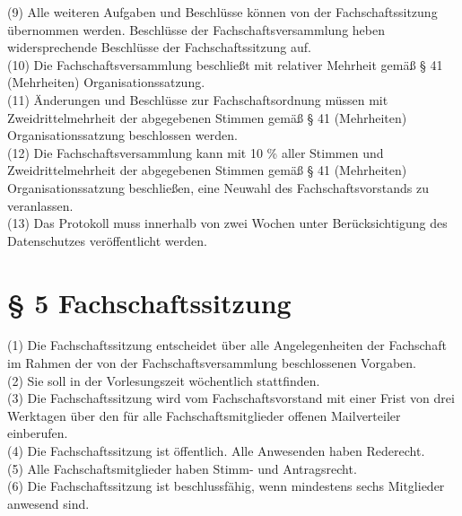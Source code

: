 \documentclass[a4paper, parskip=half, numbers=noenddot]{scrartcl}
\begin{document}
(9) Alle weiteren Aufgaben und Beschlüsse können von der Fachschaftssitzung übernommen werden. Beschlüsse der Fachschaftsversammlung heben widersprechende Beschlüsse der Fachschaftssitzung auf.\\

(10) Die Fachschaftsversammlung beschließt mit relativer Mehrheit gemäß § 41 (Mehrheiten) Organisationssatzung.\\

(11) Änderungen und Beschlüsse zur Fachschaftsordnung müssen mit Zweidrittelmehrheit der abgegebenen Stimmen gemäß § 41 (Mehrheiten) Organisationssatzung beschlossen werden.\\

(12) Die Fachschaftsversammlung kann mit 10 \% aller Stimmen und Zweidrittelmehrheit der abgegebenen Stimmen gemäß § 41 (Mehrheiten) Organisationssatzung beschließen, eine Neuwahl des Fachschaftsvorstands zu veranlassen.\\

(13) Das Protokoll muss innerhalb von zwei Wochen unter Berücksichtigung des Datenschutzes veröffentlicht werden.\\


%
%

\section*{§ 5 Fachschaftssitzung}

(1) Die Fachschaftssitzung entscheidet über alle Angelegenheiten der Fachschaft im Rahmen der von der Fachschaftsversammlung beschlossenen Vorgaben.\\

(2) Sie soll in der Vorlesungszeit wöchentlich stattfinden.\\

(3) Die Fachschaftssitzung wird vom Fachschaftsvorstand mit einer Frist von drei Werktagen über den für alle Fachschaftsmitglieder offenen Mailverteiler einberufen.\\

(4) Die Fachschaftssitzung ist öffentlich. Alle Anwesenden haben Rederecht.\\

(5) Alle Fachschaftsmitglieder haben Stimm- und Antragsrecht.\\

(6) Die Fachschaftssitzung ist beschlussfähig, wenn mindestens sechs Mitglieder anwesend sind.\\
\end{document}
